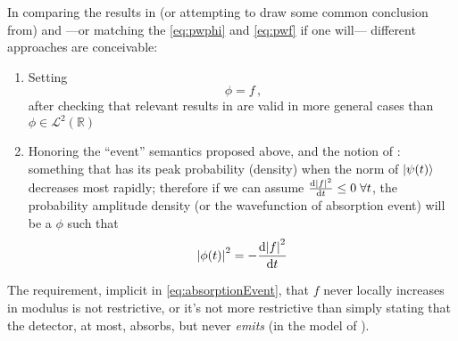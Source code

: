 In comparing the results in (or attempting to draw some common conclusion from)
\cite{Lloyd:Time} and \cite{RuschhauptAbsorption}
---or matching the \eqref{eq:pwphi} and \eqref{eq:pwf} if one will---
different approaches are conceivable:
\begin{enumerate}
  \item
    Setting
    \begin{equation}
      \phi = f \, \text{,}
    \end{equation}
    after checking that relevant results in \cite{Lloyd:Time} are valid in more general cases than
    $\phi \in \mathcal{L}^2(\mathbb{R})$
  \item
    Honoring the ``event'' semantics proposed above, and the notion of :
    something that has its peak probability (density)
    when the norm of $\ket{\psi(t)}$ decreases most rapidly; therefore if we can assume
    $\dv{\abs{f}^2}{t} \leq 0 \; \forall t$, the probability amplitude density
    (or the wavefunction of absorption event) will be a $\phi$ such that
    \begin{equation}\label{eq:absorptionEvent}
      \abs{\phi(t)}^2 = -\dv{\abs{f}^2}{t}
    \end{equation} 
\end{enumerate}

The requirement, implicit  in \eqref{eq:absorptionEvent},
that $f$ never locally increases in modulus
is not restrictive, or it's not more restrictive than simply stating
that the detector, at most, absorbs, but never \emph{emits}
(in the model of \cite{RuschhauptAbsorption}). 
